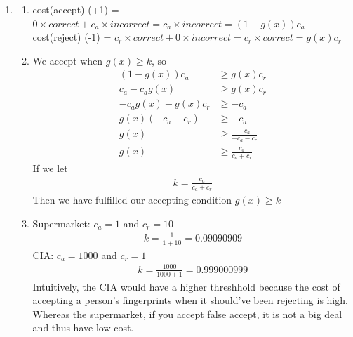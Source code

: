 \documentclass{article}
\begin{document}
\begin{enumerate}
        \item \begin{enumerate}[label=(\alph*)]
            \item cost(accept) (+1) = $0 \times correct + c_a \times incorrect = c_a \times incorrect = (1 - g(x))c_a$\\
                cost(reject) (-1) = $c_r \times correct + 0 \times incorrect = c_r \times correct = g(x)c_r$
            \item We accept when $g(x) \geq k$, so 
                \begin{align*}
                    (1 - g(x))c_a &\geq g(x)c_r \\
                    c_a - c_ag(x) &\geq g(x)c_r \\
                    -c_ag(x) - g(x)c_r &\geq -c_a\\
                    g(x)(-c_a - c_r) &\geq -c_a \\
                    g(x) &\geq \frac{-c_a}{-c_a - c_r}\\
                    g(x) &\geq \frac{c_a}{c_a + c_r}
                \end{align*}
                If we let
                \begin{align*}
                    k = \frac{c_a}{c_a + c_r}
                \end{align*}
                Then we have fulfilled our accepting condition $g(x) \geq k$
            \item Supermarket: $c_a = 1$ and $c_r = 10$
                \begin{align*}
                    k = \frac{1}{1 + 10} = 0.09090909
                \end{align*}
                CIA: $c_a = 1000$ and $c_r = 1$
                \begin{align*}
                    k = \frac{1000}{1000 + 1} = 0.999000999
                \end{align*}
                Intuitively, the CIA would have a higher threshhold because the cost of accepting a person's fingerprints when it should've been rejecting is high. Whereas the supermarket, if you accept false accept, it is not a big deal and thus have low cost.
        \end{enumerate}
    \end{enumerate}
\end{document}

